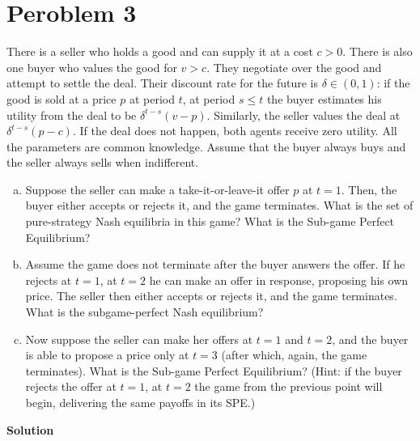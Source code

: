 \documentclass[a4paper]{article}
\begin{document}
\section*{Peroblem 3}
There is a seller who holds a good and can supply it at a cost $c > 0$. There
is also one buyer who values the good for $v > c$. They negotiate over the good and attempt to settle the deal. Their discount rate for the future is
$\delta \in (0, 1)$: if the good is sold at a price $p$ at period $t$, at period $s \le t$ the
buyer estimates his utility from the deal to be $\delta^{t-s}(v - p)$. Similarly, the
seller values the deal at $\delta^{t-s}(p-c)$. If the deal does not happen, both agents
receive zero utility. All the parameters are common knowledge. Assume
that the buyer always buys and the seller always sells when indifferent.
\begin{enumerate}[(a)]
\item Suppose the seller can make a take-it-or-leave-it offer $p$ at $t = 1$. Then,
the buyer either accepts or rejects it, and the game terminates. What
is the set of pure-strategy Nash equilibria in this game? What is the
Sub-game Perfect Equilibrium?
\item Assume the game does not terminate after the buyer answers the offer.
If he rejects at $t = 1$, at $t = 2$ he can make an offer in response,
proposing his own price. The seller then either accepts or rejects it, and
the game terminates. What is the subgame-perfect Nash equilibrium?
\item Now suppose the seller can make her offers at $t = 1$ and $t = 2$, and
the buyer is able to propose a price only at $t = 3$ (after which, again,
the game terminates). What is the Sub-game Perfect Equilibrium?
(Hint: if the buyer rejects the offer at $t = 1$, at $t = 2$ the game from
the previous point will begin, delivering the same payoffs in its SPE.)
\end{enumerate}

\textbf{Solution}
\end{document}
